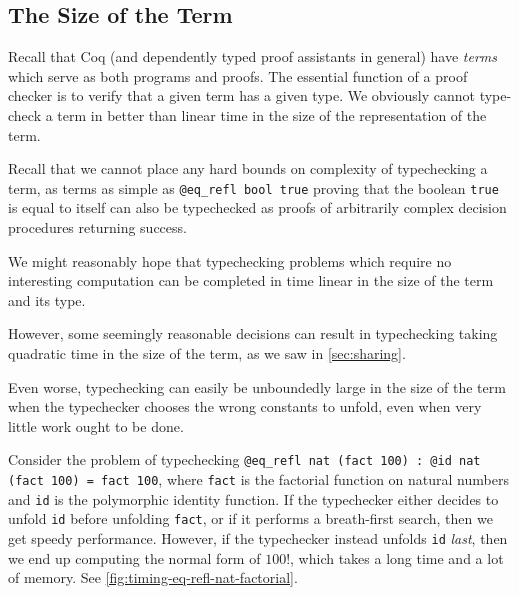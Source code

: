 \subsection{The Size of the Term}

Recall that Coq (and dependently typed proof assistants in general) have \emph{terms} which serve as both programs and proofs.
The essential function of a proof checker is to verify that a given term has a given type.
We obviously cannot type-check a term in better than linear time in the size of the representation of the term.

Recall that we cannot place any hard bounds on complexity of typechecking a term, as terms as simple as \texttt{@eq_refl bool true} proving that the boolean \texttt{true} is equal to itself can also be typechecked as proofs of arbitrarily complex decision procedures returning success.

We might reasonably hope that typechecking problems which require no interesting computation can be completed in time linear in the size of the term and its type.

However, some seemingly reasonable decisions can result in typechecking taking quadratic time in the size of the term, as we saw in \autoref{sec:sharing}.


Even worse, typechecking can easily be unboundedly large in the size of the term when the typechecker chooses the wrong constants to unfold, even when very little work ought to be done.


Consider the problem of typechecking \texttt{@eq_refl nat (fact 100) : @id nat (fact 100) = fact 100}, where \texttt{fact} is the factorial function on natural numbers and \texttt{id} is the polymorphic identity function.
If the typechecker either decides to unfold \texttt{id} before unfolding \texttt{fact}, or if it performs a breath-first search, then we get speedy performance.
However, if the typechecker instead unfolds \texttt{id} \emph{last}, then we end up computing the normal form of $100!$, which takes a long time and a lot of memory.
See \autoref{fig:timing-eq-refl-nat-factorial}.

